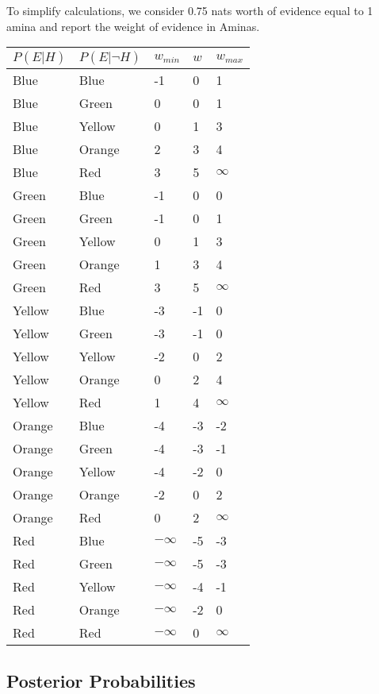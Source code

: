 \documentclass[
]{article}
\begin{document}
To simplify calculations, we consider 0.75 nats worth of evidence equal
to 1 amina and report the weight of evidence in Aminas.

\begin{longtable}[]{@{}lllll@{}}
\toprule\noalign{}
\(P(E|H)\) & \(P(E|\neg H)\) & \(w_{min}\) & \(w\) & \(w_{max}\) \\
\midrule\noalign{}
\endhead
\bottomrule\noalign{}
\endlastfoot
Blue & Blue & -1 & 0 & 1 \\
Blue & Green & 0 & 0 & 1 \\
Blue & Yellow & 0 & 1 & 3 \\
Blue & Orange & 2 & 3 & 4 \\
Blue & Red & 3 & 5 & \(\infty\) \\
Green & Blue & -1 & 0 & 0 \\
Green & Green & -1 & 0 & 1 \\
Green & Yellow & 0 & 1 & 3 \\
Green & Orange & 1 & 3 & 4 \\
Green & Red & 3 & 5 & \(\infty\) \\
Yellow & Blue & -3 & -1 & 0 \\
Yellow & Green & -3 & -1 & 0 \\
Yellow & Yellow & -2 & 0 & 2 \\
Yellow & Orange & 0 & 2 & 4 \\
Yellow & Red & 1 & 4 & \(\infty\) \\
Orange & Blue & -4 & -3 & -2 \\
Orange & Green & -4 & -3 & -1 \\
Orange & Yellow & -4 & -2 & 0 \\
Orange & Orange & -2 & 0 & 2 \\
Orange & Red & 0 & 2 & \(\infty\) \\
Red & Blue & \(-\infty\) & -5 & -3 \\
Red & Green & \(-\infty\) & -5 & -3 \\
Red & Yellow & \(-\infty\) & -4 & -1 \\
Red & Orange & \(-\infty\) & -2 & 0 \\
Red & Red & \(-\infty\) & 0 & \(\infty\) \\
\end{longtable}

\pagebreak

\subsection{Posterior Probabilities}\label{posterior-probabilities}
\end{document}
